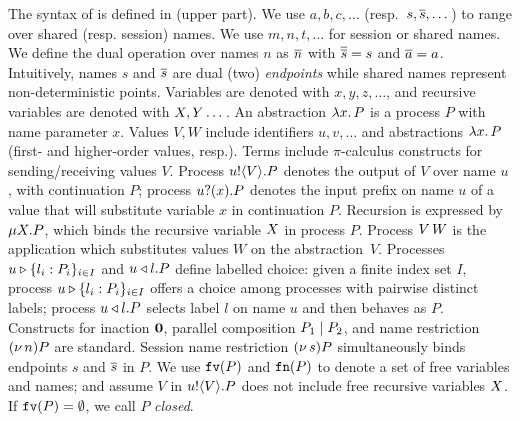 \noindent{} 
The syntax of \HOp is defined in  (upper part).
We use $a,b,c, \dots$ (resp.~$s, \overline{s}, \dots$) 
to range over shared (resp. session) names. 
We use $m, n, t, \dots$ for session or shared names. 
We define the dual operation over names $n$ as $\overline{n}$ with
$\overline{\overline{s}} = s$ and $\overline{a} = a$.
Intuitively, names $s$ and $\overline{s}$ are dual (two) \emph{endpoints} while 
shared names represent non-deterministic points. 
Variables are denoted with $x, y, z, \dots$, 
and recursive variables are denoted with $X, Y \dots$.
An abstraction %
$\lambda x.\,P$ is a process $P$ with name parameter $x$.
Values $V,W$ include 
identifiers $u, v, \ldots$ %
and 
abstractions $\lambda x.\,P$ (first- and higher-order values, resp.). 
{Terms} 
include $\pi$-calculus constructs for sending/receiving values $V$.
Process $u ! \langle V \rangle . P$ denotes the output of   $V$
over name $u$, with continuation $P$;
process $u ? (x) . P$ denotes the input prefix on name $u$ of a value
that 
will substitute variable $x$ in continuation $P$. 
Recursion is expressed by $\mu X. P$,
which binds the recursive variable $X$ in process $P$.
Process 
$V\, {W}$ 
is the application
which substitutes values $W$ on the abstraction~$V$. 
Processes $u \triangleright \{l_i: P_i\}_{i \in I}$  and $u \triangleleft l . P$ define labelled choice:
given a finite index set $I$, process $u \triangleright \{l_i: P_i\}_{i \in I}$ offers a choice 
among processes with pairwise distinct labels;
 process $u \triangleleft l . P$ selects label $l$ on name $u$ and then behaves as $P$.
Constructs for 
inaction $\mathbf{0}$,  parallel composition $P_1 \;|\; P_2$, and 
name restriction $(\nu\, n) P$ are standard.
Session name restriction $(\nu\, s) P$ simultaneously binds endpoints $s$ and $\overline{s}$ in $P$.
We use $\mathtt{fv}(P)$ and $\mathtt{fn}(P)$ to denote a set of free 
variables and names; 
and assume $V$ in $u ! \langle V \rangle .{P}$ does not include free recursive 
variables $X$. 
If $\mathtt{fv}(P) = \emptyset$, we call $P$ {\em closed}.

